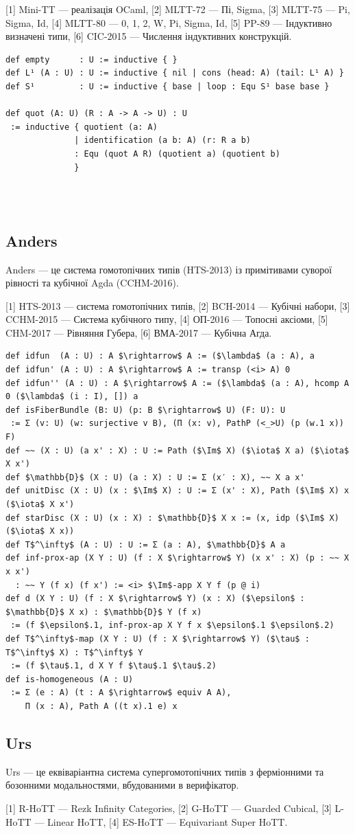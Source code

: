 [1] Mini-TT — реалізація OCaml,
[2] MLTT-72 — Пі, Sigma,
[3] MLTT-75 — Pi, Sigma, Id,
[4] MLTT-80 — 0, 1, 2, W, Pi, Sigma, Id,
[5] PP-89 — Індуктивно визначені типи,
[6] CIC-2015 — Числення індуктивних конструкцій.

\begin{lstlisting}
def empty      : U := inductive { }
def L¹ (A : U) : U := inductive { nil | cons (head: A) (tail: L¹ A) }
def S¹         : U := inductive { base | loop : Equ S¹ base base }

def quot (A: U) (R : A -> A -> U) : U
 := inductive { quotient (a: A)
              | identification (a b: A) (r: R a b)
              : Equ (quot A R) (quotient a) (quotient b)
              }
\end{lstlisting}
\\
\\
\newpage
\subsection*{Anders}

Anders — це система гомотопічних типів (HTS-2013) із примітивами суворої рівності та кубічної Agda (CCHM-2016).

[1] HTS-2013 — система гомотопічних типів,
[2] BCH-2014 — Кубічні набори,
[3] CCHM-2015 — Система кубічного типу,
[4] ОП-2016 — Топосні аксіоми,
[5] CHM-2017 — Рівняння Губера,
[6] ВМА-2017 — Кубічна Агда.

\begin{lstlisting}
def idfun  (A : U) : A $\rightarrow$ A := ($\lambda$ (a : A), a
def idfun' (A : U) : A $\rightarrow$ A := transp (<i> A) 0
def idfun'' (A : U) : A $\rightarrow$ A := ($\lambda$ (a : A), hcomp A 0 ($\lambda$ (i : I), []) a
def isFiberBundle (B: U) (p: B $\rightarrow$ U) (F: U): U
 := Σ (v: U) (w: surjective v B), (Π (x: v), PathP (<_>U) (p (w.1 x)) F)
def ~~ (X : U) (a x' : X) : U := Path ($\Im$ X) ($\iota$ X a) ($\iota$ X x')
def $\mathbb{D}$ (X : U) (a : X) : U := Σ (x′ : X), ~~ X a x'
def unitDisc (X : U) (x : $\Im$ X) : U := Σ (x' : X), Path ($\Im$ X) x ($\iota$ X x')
def starDisc (X : U) (x : X) : $\mathbb{D}$ X x := (x, idp ($\Im$ X) ($\iota$ X x))
def T$^\infty$ (A : U) : U := Σ (a : A), $\mathbb{D}$ A a
def inf-prox-ap (X Y : U) (f : X $\rightarrow$ Y) (x x' : X) (p : ~~ X x x')
  : ~~ Y (f x) (f x') := <i> $\Im$-app X Y f (p @ i)
def d (X Y : U) (f : X $\rightarrow$ Y) (x : X) ($\epsilon$ : $\mathbb{D}$ X x) : $\mathbb{D}$ Y (f x)
 := (f $\epsilon$.1, inf-prox-ap X Y f x $\epsilon$.1 $\epsilon$.2)
def T$^\infty$-map (X Y : U) (f : X $\rightarrow$ Y) ($\tau$ : T$^\infty$ X) : T$^\infty$ Y
 := (f $\tau$.1, d X Y f $\tau$.1 $\tau$.2)
def is-homogeneous (A : U)
 := Σ (e : A) (t : A $\rightarrow$ equiv A A),
    Π (x : A), Path A ((t x).1 e) x
\end{lstlisting}

\subsection*{Urs}

Urs — це еквіваріантна система супергомотопічних типів з ферміонними та бозонними модальностями,
вбудованими в верифікатор.

[1] R-HoTT — Rezk Infinity Categories,
[2] G-HoTT — Guarded Cubical,
[3] L-HoTT — Linear HoTT,
[4] ES-HoTT — Equivariant Super HoTT.

